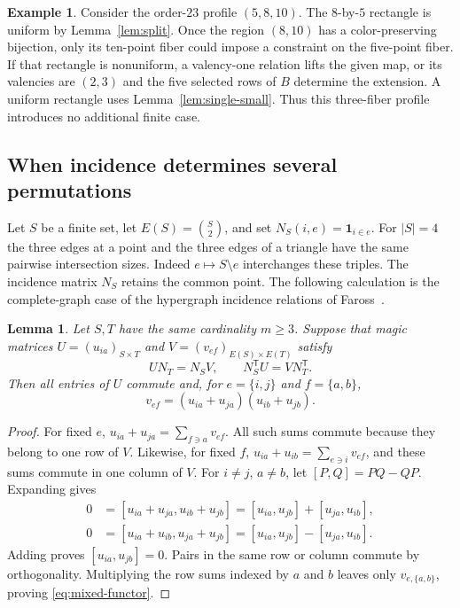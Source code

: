 \documentclass[11pt,reqno]{amsart}
\numberwithin{equation}{section}
\newtheorem{lemma}[theorem]{Lemma}
\theoremstyle{definition}
\newtheorem{example}[theorem]{Example}
\begin{document}
\begin{example}
Consider the order-$23$ profile $(5,8,10)$. The $8$-by-$5$ rectangle is uniform by Lemma~\ref{lem:split}. Once the region $(8,10)$ has a color-preserving bijection, only its ten-point fiber could impose a constraint on the five-point fiber. If that rectangle is nonuniform, a valency-one relation lifts the given map, or its valencies are $(2,3)$ and the five selected rows of $B$ determine the extension. A uniform rectangle uses Lemma~\ref{lem:single-small}. Thus this three-fiber profile introduces no additional finite case.
\end{example}

\subsection{When incidence determines several permutations}\label{sec:mixed466}
Let $S$ be a finite set, let $E(S)=\binom{S}{2}$, and set $N_S(i,e)=\mathbf 1_{i\in e}$. For $|S|=4$ the three edges at a point and the three edges of a triangle have the same pairwise intersection sizes. Indeed $e\mapsto S\setminus e$ interchanges these triples. The incidence matrix $N_S$ retains the common point. The following calculation is the complete-graph case of the hypergraph incidence relations of Faross~\cite[\S4.2]{Faross}.


\begin{lemma}\label{lem:mixed-inc}
Let $S,T$ have the same cardinality $m\ge3$.
Suppose that magic matrices $U=(u_{ia})_{S\times T}$ and
$V=(v_{ef})_{E(S)\times E(T)}$ satisfy
\[
 U N_T=N_S V,\qquad N_S^{\mathsf T}U=V N_T^{\mathsf T}.
\]
Then all entries of $U$ commute and, for $e=\{i,j\}$ and $f=\{a,b\}$,
\begin{equation}
 v_{ef}=(u_{ia}+u_{ja})(u_{ib}+u_{jb}).
 \label{eq:mixed-functor}
\end{equation}
\end{lemma}
\begin{proof}
For fixed $e$, $u_{ia}+u_{ja}=\sum_{f\ni a}v_{ef}$. All such sums commute
because they belong to one row of $V$. Likewise, for fixed $f$,
$u_{ia}+u_{ib}=\sum_{e\ni i}v_{ef}$, and these sums commute in one column of
$V$. For $i\ne j$, $a\ne b$, let $[P,Q]=PQ-QP$. Expanding gives
\begin{align*}
0&=[u_{ia}+u_{ja},u_{ib}+u_{jb}]
   =[u_{ia},u_{jb}]+[u_{ja},u_{ib}],\\
0&=[u_{ia}+u_{ib},u_{ja}+u_{jb}]
   =[u_{ia},u_{jb}]-[u_{ja},u_{ib}].
\end{align*}
Adding proves $[u_{ia},u_{jb}]=0$. Pairs in the same row or column
commute by orthogonality. Multiplying the row sums indexed by $a$ and $b$
leaves only $v_{e,\{a,b\}}$, proving \eqref{eq:mixed-functor}.
\end{proof}
\end{document}

